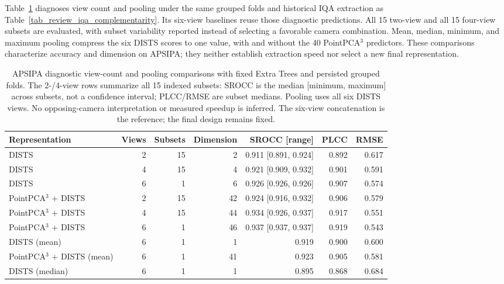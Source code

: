 \documentclass[final,3p,times,twocolumn]{elsarticle}
\begin{document}
Table~\ref{tab_review_views_pooling} diagnoses view count and pooling under the same grouped folds and historical IQA extraction as Table~\ref{tab_review_iqa_complementarity}. Its six-view baselines reuse those diagnostic predictions. All 15 two-view and all 15 four-view subsets are evaluated, with subset variability reported instead of selecting a favorable camera combination. Mean, median, minimum, and maximum pooling compress the six \gls{DISTS} scores to one value, with and without the 40 PointPCA$^3$ predictors. These comparisons characterize accuracy and dimension on APSIPA; they neither establish extraction speed nor select a new final representation.

\begin{table}[t!]
    \centering
    \caption{APSIPA diagnostic view-count and pooling comparisons with fixed Extra Trees and persisted grouped folds. The 2-/4-view rows summarize all 15 indexed subsets: SROCC is the median [minimum, maximum] across subsets, not a confidence interval; PLCC/RMSE are subset medians. Pooling uses all six \gls{DISTS} views. No opposing-camera interpretation or measured speedup is inferred. The six-view concatenation is the reference; the final design remains fixed.}
    \label{tab_review_views_pooling}
    \scriptsize
    \begin{adjustbox}{max width=\textwidth}
        \begin{tabular}{lrrrrrr}
        \toprule
        Representation & Views & Subsets & Dimension & SROCC [range] & PLCC & RMSE \\
        \midrule
        DISTS & 2 & 15 & 2 & 0.911 [0.891, 0.924] & 0.892 & 0.617 \\
        DISTS & 4 & 15 & 4 & 0.921 [0.909, 0.932] & 0.901 & 0.591 \\
        DISTS & 6 & 1 & 6 & 0.926 [0.926, 0.926] & 0.907 & 0.574 \\
        PointPCA$^3$ + DISTS & 2 & 15 & 42 & 0.924 [0.916, 0.932] & 0.906 & 0.579 \\
        PointPCA$^3$ + DISTS & 4 & 15 & 44 & 0.934 [0.926, 0.937] & 0.917 & 0.551 \\
        PointPCA$^3$ + DISTS & 6 & 1 & 46 & 0.937 [0.937, 0.937] & 0.919 & 0.543 \\
        \midrule
        DISTS (mean) & 6 & 1 & 1 & 0.919 & 0.900 & 0.600 \\
        PointPCA$^3$ + DISTS (mean) & 6 & 1 & 41 & 0.923 & 0.905 & 0.581 \\
        DISTS (median) & 6 & 1 & 1 & 0.895 & 0.868 & 0.684 \\

\end{tabular}
\end{adjustbox}
\end{table}
\end{document}
